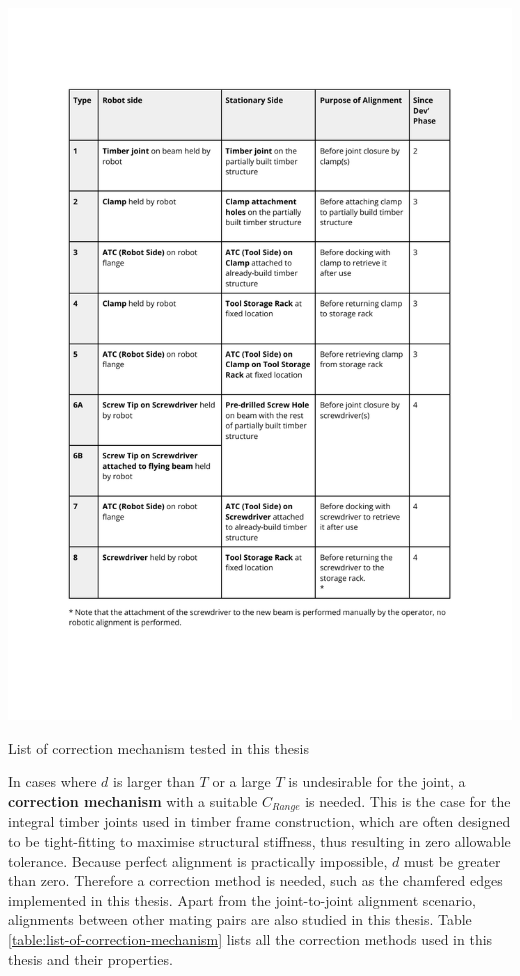 \begin{table}[b]
    \includegraphics[page=5, trim=25.4mm 132mm 23.4mm 33mm, clip, width=\textwidth]{tables/Tables in Chapter 9 to 11.pdf}
    \caption{List of correction mechanism tested in this thesis}
    \label{table:list-of-correction-mechanism}
\end{table}

In cases where $d$ is larger than $T$ or a large $T$ is undesirable for the joint, a \textbf{correction mechanism} with a suitable $C_{Range}$ is needed. This is the case for the integral timber joints used in timber frame construction, which are often designed to be tight-fitting to maximise structural stiffness, thus resulting in zero allowable tolerance. Because perfect alignment is practically impossible, $d$ must be greater than zero. Therefore a correction method is needed, such as the chamfered edges implemented in this thesis.
Apart from the joint-to-joint alignment scenario, alignments between other mating pairs are also studied in this thesis. Table \ref{table:list-of-correction-mechanism} lists all the correction methods used in this thesis and their properties.

